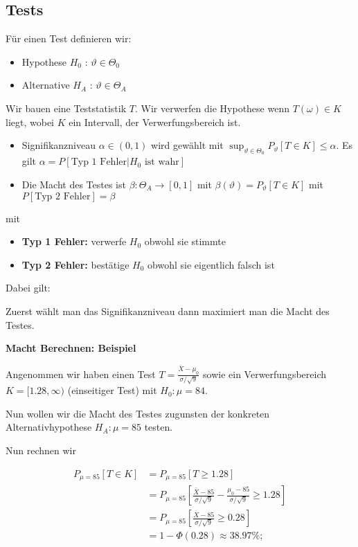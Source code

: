 \documentclass[25pt]{sciposter}
\begin{document}
\begin{multicols}{3}
		\section{Tests}
		
		Für einen Test definieren wir:
		\begin{itemize}
			\item Hypothese $H_0$ : $\vartheta \in \Theta_0$
			\item Alternative $H_A$ : $\vartheta \in \Theta_A$
		\end{itemize}
		
		Wir bauen eine Teststatistik $T$. Wir verwerfen die Hypothese wenn $T(\omega) \in K$ liegt, wobei $K$ ein Intervall, der Verwerfungsbereich ist.
		
		\begin{itemize}
			\item Signifikanzniveau $\alpha \in (0,1)$ wird gewählt mit $\sup_{\vartheta\in \Theta_0} P_{\vartheta} \left[T\in K\right] \leq \alpha$. Es gilt $\alpha = P[\text{Typ 1 Fehler} | H_0\text{ ist wahr}]$
			\item Die Macht des Testes ist $\beta : \Theta_A \to [0,1]$ mit $\beta(\vartheta) = P_{\vartheta}[T\in K]$ mit $P[\text{Typ 2 Fehler}] = \beta$
		\end{itemize}
		
		mit 
		
		\begin{itemize}
			\item \textbf{Typ 1 Fehler:} verwerfe $H_0$ obwohl sie stimmte
			\item \textbf{Typ 2 Fehler:} bestätige $H_0$ obwohl sie eigentlich falsch ist
		\end{itemize}
		
		Dabei gilt:
		
		Zuerst wählt man das Signifikanzniveau dann maximiert man die Macht des Testes.
		
		
		\textbf{Macht Berechnen: Beispiel}
		
		Angenommen wir haben einen Test $T = \frac{\overline{X} - \mu_0}{\sigma / \sqrt{9}}$ sowie ein Verwerfungsbereich $K=[1.28,\infty)$ (einseitiger Test) mit $H_0 : \mu = 84$.
		
		Nun wollen wir die Macht des Testes zugunsten der konkreten Alternativhypothese $H_A: \mu = 85$ testen.
		
		Nun rechnen wir
		
		\begin{align*}
			P_{\mu = 85}[T\in K] &= P_{\mu = 85}[T\geq 1.28]\\
			&= P_{\mu = 85} \left[\frac{\overline{X} -85}{\sigma / \sqrt{9}} - \frac{\mu_0  -85}{\sigma / \sqrt{9}} \geq 1.28 \right]\\
			&= P_{\mu = 85} \left[\frac{\overline{X} -85}{\sigma / \sqrt{9}}  \geq 0.28 \right]\\
			&= 1 - \Phi(0.28) \approx 38.97\%;
		\end{align*}
		

\end{multicols}
\end{document}
